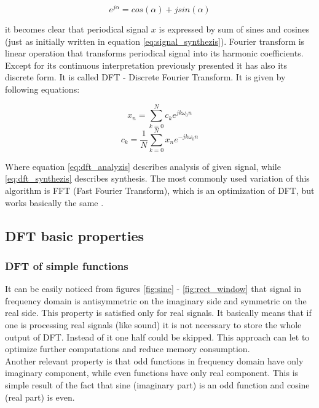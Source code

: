 \documentclass[magister]{dyplom}
\begin{document}
	\begin{equation}
		e^{j\alpha} = cos(\alpha) + j sin(\alpha)
	\end{equation}
	
	it becomes clear that periodical signal $x$ is expressed by sum of sines and cosines (just as initially written in equation \ref{eq:signal_synthezis}). Fourier transform is linear operation that transforms periodical signal into its harmonic coefficients. Except for its continuous interpretation previously presented it has also its discrete form. It is called \gls{DFT} - Discrete Fourier Transform. It is given by following equations:
	
	\begin{equation} \label{eq:dft_synthezis}
		x_n = \sum_{k=0}^{N} c_k e^{jk\omega_0n}
	\end{equation}
	\begin{equation} \label{eq:dft_analyzis}
		c_k = \frac{1}{N} \sum_{k=0}^{N} x_n e^{-jk\omega_0n} 
	\end{equation}
	
	Where equation \ref{eq:dft_analyzis} describes analysis of given signal, while \ref{eq:dft_synthezis} describes synthesis. The most commonly used variation of this algorithm is \gls{FFT} (Fast Fourier Transform), which is an optimization of \gls{DFT}, but works basically the same \cite{IntroductionDSPBook}.
	
	\subsection{DFT basic properties}
	
	\subsubsection{DFT of simple functions}
	
	It can be easily noticed from figures \ref{fig:sine} - \ref{fig:rect_window} that signal in frequency domain is antisymmetric on the imaginary side and symmetric on the real side. This property is satisfied only for real signals. It basically means that if one is processing real signals (like sound) it is not necessary to store the whole output of \gls{DFT}. Instead of it one half could be skipped. This approach can let to optimize further computations and reduce memory consumption.\\
	
	Another relevant property is that odd functions in frequency domain have only imaginary component, while even functions have only real component. This is simple result of the fact that sine (imaginary part) is an odd function and cosine (real part) is even. 
	
\end{document}
